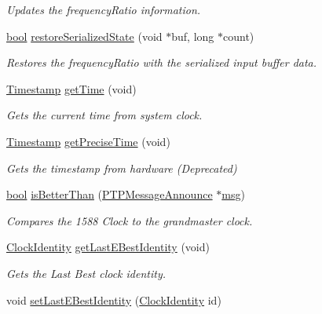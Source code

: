 \begin{DoxyCompactItemize}
\begin{DoxyCompactList}\small\item\em Updates the frequency\+Ratio information. \end{DoxyCompactList}\item 
\hyperlink{avb__gptp_8h_af6a258d8f3ee5206d682d799316314b1}{bool} \hyperlink{class_i_e_e_e1588_clock_a383669aeae1b1eeaa021267a0041d163}{restore\+Serialized\+State} (void $\ast$buf, long $\ast$count)
\begin{DoxyCompactList}\small\item\em Restores the frequency\+Ratio with the serialized input buffer data. \end{DoxyCompactList}\item 
\hyperlink{class_timestamp}{Timestamp} \hyperlink{class_i_e_e_e1588_clock_af9e1d36b43afdf8857c5ed8b0bc03255}{get\+Time} (void)
\begin{DoxyCompactList}\small\item\em Gets the current time from system clock. \end{DoxyCompactList}\item 
\hyperlink{class_timestamp}{Timestamp} \hyperlink{class_i_e_e_e1588_clock_a79c9f56e314286ad578887580b971083}{get\+Precise\+Time} (void)
\begin{DoxyCompactList}\small\item\em Gets the timestamp from hardware (Deprecated) \end{DoxyCompactList}\item 
\hyperlink{avb__gptp_8h_af6a258d8f3ee5206d682d799316314b1}{bool} \hyperlink{class_i_e_e_e1588_clock_a3bf4e41c1ccf46f20b2330330bd69630}{is\+Better\+Than} (\hyperlink{class_p_t_p_message_announce}{P\+T\+P\+Message\+Announce} $\ast$\hyperlink{openavb__log_8c_a0c7e58a50354c4a4d6dad428d0e47029}{msg})
\begin{DoxyCompactList}\small\item\em Compares the 1588 Clock to the grandmaster clock. \end{DoxyCompactList}\item 
\hyperlink{class_clock_identity}{Clock\+Identity} \hyperlink{class_i_e_e_e1588_clock_ac49f35801b6e22547682034e47b02c90}{get\+Last\+E\+Best\+Identity} (void)
\begin{DoxyCompactList}\small\item\em Gets the Last Best clock identity. \end{DoxyCompactList}\item 
void \hyperlink{class_i_e_e_e1588_clock_a92b9d40586b473e0538333eb446f05f9}{set\+Last\+E\+Best\+Identity} (\hyperlink{class_clock_identity}{Clock\+Identity} id)

\end{DoxyCompactItemize}
